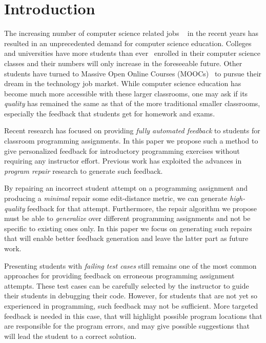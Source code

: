 \section{Introduction}
\label{sec:intro}

The increasing number of computer science related jobs
~\citep[][]{compsci-demand} in the recent years has resulted in an unprecedented
demand for computer science education. Colleges and universities have more
students than ever~\citep[][]{compsci-classes} enrolled in their computer
science classes and their numbers will only increase in the foreseeable future.
Other students have
turned to Massive Open Online Courses (MOOCs)~\citep[][]{moocs}
to pursue their dream in the technology job
market. While computer science education has become much more accessible with
these larger classrooms, one may ask if its \emph{quality} has
remained the same as that of the more traditional smaller classrooms,
especially the feedback that students get for homework and exams.

Recent research has focused on providing \emph{fully automated feedback} to
students for classroom programming assignments. In
this paper we propose such a method to give personalized
feedback for introductory programming exercises without requiring
any instructor effort. Previous work has exploited the advances in \emph{program
repair} research to generate such feedback.

By repairing an incorrect student attempt on a programming assignment and
producing a \emph{minimal} repair \wrt some edit-distance metric,
we can generate \emph{high-quality}
feedback for that attempt. Furthermore, the repair algorithm we propose must be
able to \emph{generalize} over different programming assignments and not be
specific to existing ones only. In this paper we focus on generating such
repairs that will enable better feedback generation and leave the latter part as
future work.

Presenting students with \emph{failing test cases} still remains one of the most
common approaches for providing feedback on erroneous programming assignment
attempts. These test cases can be carefully selected by the instructor to guide
their students in debugging their code. However, for students that are not yet
so experienced in programming, such feedback may not be sufficient. More
targeted feedback is needed in this case, that will highlight possible program
locations that are responsible for the program errors, and may give possible
suggestions that will lead the student to a correct solution.

